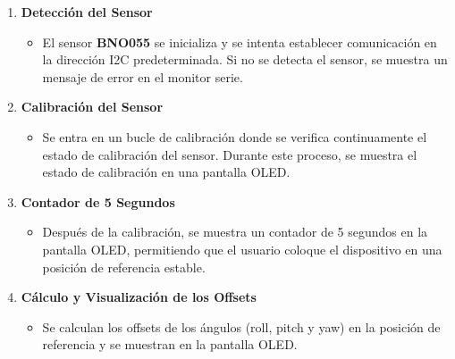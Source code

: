             \begin{enumerate}
                \item \textbf{Detección del Sensor} \vspace{5px}
            
                \begin{itemize}
                    \item El sensor \textbf{BNO055} se inicializa y se intenta establecer comunicación en la dirección I2C predeterminada. Si no se detecta el sensor, se muestra un mensaje de error en el monitor serie.
                \end{itemize}\vspace{5px}

                \item \textbf{Calibración del Sensor}\vspace{5px}
                
                \begin{itemize}
                    \item Se entra en un bucle de calibración donde se verifica continuamente el estado de calibración del sensor. Durante este proceso, se muestra el estado de calibración en una pantalla OLED.
                \end{itemize}\vspace{5px}

                \item \textbf{Contador de 5 Segundos}\vspace{5px}
                
                \begin{itemize}\vspace{5px}

                    \item Después de la calibración, se muestra un contador de 5 segundos en la pantalla OLED, permitiendo que el usuario coloque el dispositivo en una posición de referencia estable.
                \end{itemize}\vspace{5px}

                \item \textbf{Cálculo y Visualización de los Offsets}\vspace{5px}
                
                \begin{itemize}
                    \item Se calculan los offsets de los ángulos (roll, pitch y yaw) en la posición de referencia y se muestran en la pantalla OLED.
                \end{itemize}\vspace{5px}

            \end{enumerate}


